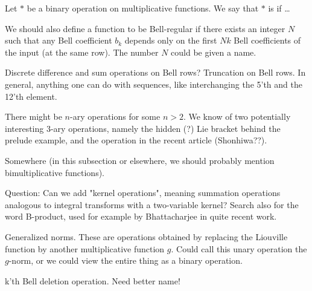 \begin{definition}
Let $*$ be a binary operation on multiplicative functions. We say that $*$ is  if \ldots 
\end{definition}

We should also define a function to be Bell-regular if there exists an integer $N$ such that any Bell coefficient $b_k$ depends only on the first $Nk$ Bell coefficients of the input (at the same row). The number $N$ could be given a name.


Discrete difference and sum operations on Bell rows? Truncation on Bell rows. In general, anything one can do with sequences, like interchanging the 5'th and the 12'th element.

There might be $n$-ary operations for some $n>2$. We know of two potentially interesting 3-ary operations, namely the hidden (?) Lie bracket behind the prelude example, and the operation in the recent article (Shonhiwa??).  


Somewhere (in this subsection or elsewhere, we should probably mention bimultiplicative functions). 

Question: Can we add "kernel operations", meaning summation operations analogous to integral transforms with a two-variable kernel? Search also for the word B-product, used for example by Bhattacharjee in quite recent work.

Generalized norms. These are operations obtained by replacing the Liouville function by another multiplicative function $g$. Could call this unary operation the $g$-norm, or we could view the entire thing as a binary operation.

\begin{propdef}
k'th Bell deletion operation. Need better name!
\end{propdef}

